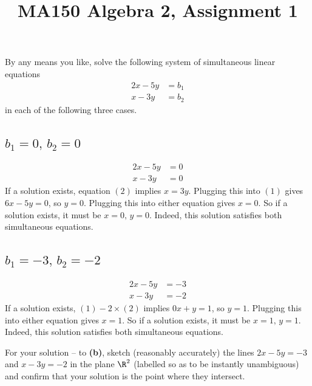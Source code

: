 \documentclass[a4paper]{article}
\title{MA150 Algebra 2, Assignment 1}
\begin{document}
\maketitle

\setlength{\parindent}{0em}
\setlength{\parskip}{1em}


\begin{questionbody}
By any means you like, solve the following system of simultaneous linear equations
\begin{align*}
2x - 5y &= b_1\\
x - 3y &= b_2
\end{align*}
in each of the following three cases.
\end{questionbody}

\subsection{$b_1 = 0,\, b_2 = 0$} %

\begin{align*}
2x - 5y &= 0 \tag{1}\\
x - 3y &= 0 \tag{2}
\end{align*}
If a solution exists, equation $(2)$ implies $x = 3y$. Plugging this into $(1)$ gives $6x - 5y = 0$, so $y=0$. Plugging this into either equation gives $x=0$.
So if a solution exists, it must be $x=0,\, y=0$. Indeed, this solution satisfies both simultaneous equations.

\subsection{$b_1 = -3,\, b_2 = -2$} %

\begin{align*}
2x - 5y &= -3 \tag{1}\\
x - 3y &= -2 \tag{2}
\end{align*}
If a solution exists, $(1) - 2 \times (2)$ implies $0x + y = 1$, so $y=1$. Plugging this into either equation gives $x=1$.
So if a solution exists, it must be $x=1,\, y=1$. Indeed, this solution satisfies both simultaneous equations.

\begin{questionbody}
For your solution -- to \textbf{(b)}, sketch (reasonably accurately) the lines $2x - 5y = -3$ and
$x - 3y = -2$ in the plane $\R^2$ (labelled so as to be instantly unambiguous) and confirm
that your solution is the point where they intersect.
\end{questionbody}
\end{document}
